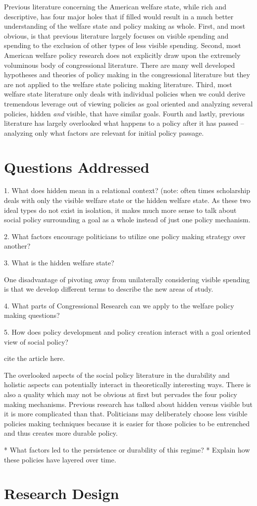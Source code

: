 \documentclass[12pt]{article}
\begin{document}
Previous literature concerning the American welfare state, while rich and descriptive, has four major holes that if filled would result in a much better understanding of the welfare state and policy making as whole. First, and most obvious, is that previous literature largely focuses on visible spending and spending to the exclusion of other types of less visible spending. Second, most American welfare policy research does not explicitly draw upon the extremely voluminous body of congressional literature. There are many well developed hypotheses and theories of policy making in the congressional literature but they are not applied to the welfare state policing making literature. Third, most welfare state literature only deals with individual policies when we could derive tremendous leverage out of viewing policies as goal oriented and analyzing several policies, hidden \emph{and} visible, that have similar goals. Fourth and lastly, previous literature has largely overlooked what happens to a policy after it has passed -- analyzing only what factors are relevant for initial policy passage.

 
\section{Questions Addressed}

1. What does hidden mean in a relational context?
(note: often times scholarship deals with only the visible welfare state or the hidden welfare state. As these two ideal types do not exist in isolation, it makes much more sense to talk about social policy surrounding a goal as a whole instead of just one policy mechanism.

2. What factors encourage politicians to utilize one policy making strategy over another?

3. What is the hidden welfare state? 

One disadvantage of pivoting away from unilaterally considering visible spending is that we develop different terms to describe the new areas of study.

4. What parts of Congressional Research can we apply to the welfare policy making questions?

5. How does policy development and policy creation interact with a goal oriented view of social policy?

cite the \citep{pierson2004b} article here.

The overlooked aspects of the social policy literature in the durability and holistic aspects can potentially interact in theoretically interesting ways.
There is also a quality which may not be obvious at first but pervades the four policy making mechanisms. Previous research has talked about hidden versus visible but it is more complicated than that. Politicians may deliberately choose less visible policies making techniques because it is easier for those policies to be entrenched and thus creates more durable policy.

		* What factors led to the persistence or durability of this regime?
		* Explain how these policies have layered over time.


\section{Research Design}





\newpage
    {}


\end{document}
